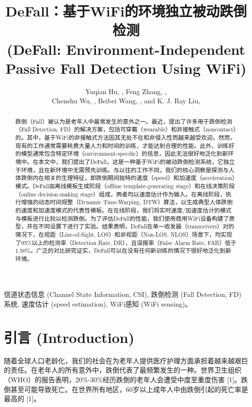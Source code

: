 \documentclass[journal]{IEEEtran}
\begin{document}
\title{DeFall：基于WiFi的环境独立被动跌倒检测 \\ (DeFall: Environment-Independent Passive Fall Detection Using WiFi)}

\author{Yuqian Hu, , Feng Zhang, , \\
Chenshu Wu, , Beibei Wang, , and K. J. Ray Liu, 
}

\maketitle

\begin{abstract}
跌倒（Fall）被认为是老年人中最常发生的意外之一。最近，提出了许多用于跌倒检测（Fall Detection, FD）的解决方案，包括可穿戴（wearable）和非接触式（noncontact）的。其中，基于WiFi的非接触式方法因其无处不在和非侵入性而越来越受欢迎。然而，现有的工作通常需要耗费大量人力和时间的训练，才能达到合理的性能。此外，训练好的模型通常包含特定环境（environment-specific）的信息，因此无法很好地泛化到新环境中。在本文中，我们提出了DeFall，这是一种基于WiFi的被动跌倒检测系统，它独立于环境，且在新环境中无需预先训练。与以往的工作不同，我们的核心洞察是探测与人体跌倒内在相关的生理特征，即跌倒期间独特的速度（speed）和加速度（acceleration）模式。DeFall由离线模板生成阶段（offline template-generating stage）和在线决策阶段（online decision-making stage）组成，两者均以速度估计作为输入。在离线阶段，执行增强的动态时间规整（Dynamic Time-Warping, DTW）算法，以生成典型人体跌倒的速度和加速度模式的代表性模板。在在线阶段，我们将实时速度/加速度估计的模式与模板进行比较以检测跌倒。为了评估DeFall的性能，我们使用商用WiFi设备构建了原型，并在不同设置下进行了实验。结果表明，DeFall在单一收发器（transceivers）对的情况下，在视距（Line-of-Sight, LOS）和非视距（Non-LOS, NLOS）场景下，均实现了95\%以上的检测率（Detection Rate, DR），且误报率（False Alarm Rate, FAR）低于1.50\%。广泛的对比研究证实，DeFall可以在没有任何新训练的情况下很好地泛化到新环境。
\end{abstract}

\begin{IEEEkeywords}
信道状态信息 (Channel State Information, CSI), 跌倒检测 (Fall Detection, FD) 系统, 速度估计 (speed estimation), WiFi感知 (WiFi sensing)。
\end{IEEEkeywords}

\section{引言 (Introduction)}
随着全球人口老龄化，我们的社会在为老年人提供医疗护理方面承担着越来越艰巨的责任。在老年人的所有意外中，跌倒代表了最频繁发生的一种。世界卫生组织（WHO）的报告表明，20\%-30\%经历跌倒的老年人会遭受中度至重度伤害 [1]。跌倒甚至可能导致死亡。在世界所有地区，60岁以上成年人中由跌倒引起的死亡率是最高的 [1]。
\end{document}
